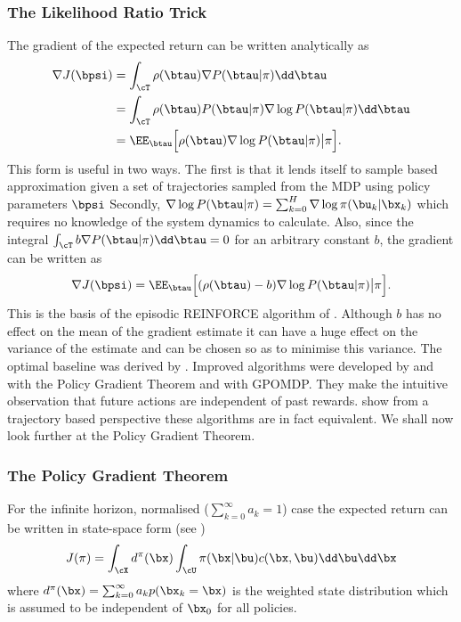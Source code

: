 \subsubsection{The Likelihood Ratio Trick}
The gradient of the expected return can be written analytically as
\begin{align}
\nabla J(\bpsi) &= \int_{\cT} \rho(\btau) \nabla P(\btau|\pi) \dd \btau \\
&= \int_{\cT}  \rho(\btau) P(\btau|\pi)\nabla\log P(\btau|\pi) \dd \btau \\
&= \EE_{\btau} \Big[ \rho(\btau) \nabla\log P(\btau|\pi)  \big|\pi \Big].
\end{align}
This form is useful in two ways. The first is that it lends itself to sample based approximation given a set of trajectories sampled from the MDP using policy parameters $\bpsi$ Secondly, $\nabla \log P(\btau|\pi) = \sum_{k=0}^H \nabla \log \pi(\bu_k|\bx_k)$ which requires no knowledge of the system dynamics to calculate. Also, since the integral $\int_{\cT}b \nabla  P(\btau|\pi) \dd \btau = 0$ for an arbitrary constant $b$, the gradient can be written as
\begin{equation}
\nabla J(\bpsi) = \EE_{\btau} \Big[ (\rho(\btau) - b) \nabla \log P(\btau|\pi)  \big|\pi \Big].
\end{equation}
This is the basis of the episodic REINFORCE algorithm of \cite{Wil92}. Although $b$ has no effect on the mean of the gradient estimate it can have a huge effect on the variance of the estimate and can be chosen so as to minimise this variance. The optimal baseline was derived by \cite{PS08}. Improved algorithms were developed by \cite{SMSM00} and \cite{MT01} with the Policy Gradient Theorem and \cite{BB01} with GPOMDP. They make the intuitive observation that future actions are independent of past rewards. \cite{PS08} show from a trajectory based perspective these algorithms are in fact equivalent. We shall now look further at the Policy Gradient Theorem.

\subsubsection{The Policy Gradient Theorem}
For the infinite horizon, normalised ($\sum_{k=0}^\infty a_k=1$) case the expected return can be written in state-space form (see \cite{SMSM00})
\begin{equation}
J(\pi) = \int_{\cX} d^\pi(\bx) \int_{\cU} \pi(\bx|\bu) c(\bx,\bu) \dd \bu\dd\bx
\end{equation}
where $d^\pi(\bx) = \sum_{k=0}^\infty a_kp(\bx_k=\bx)$ is the weighted state distribution which is assumed to be independent of $\bx_0$ for all policies.

